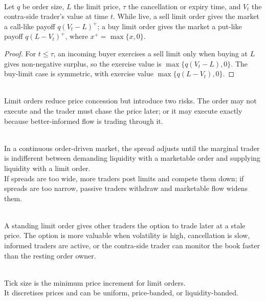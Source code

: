 \documentclass[a4paper,oneside,openany]{book}
\begin{document}
\begin{proposition} \\
Let $q$ be order size, $L$ the limit price, $\tau$ the cancellation or expiry time, and $V_t$ the contra-side trader's value at time $t$. While live, a sell limit order gives the market a call-like payoff $q(V_t-L)^+$; a buy limit order gives the market a put-like payoff $q(L-V_t)^+$, where $x^+=\max\{x,0\}$.
\begin{proof}
For $t\leq\tau$, an incoming buyer exercises a sell limit only when buying at $L$ gives non-negative surplus, so the exercise value is $\max\{q(V_t-L),0\}$. The buy-limit case is symmetric, with exercise value $\max\{q(L-V_t),0\}$.
\end{proof}
\end{proposition}

\begin{caveat} \\
Limit orders reduce price concession but introduce two risks. The order may not execute and the trader must chase the price later; or it may execute exactly because better-informed flow is trading through it.
\end{caveat}

\begin{principle} \\
In a continuous order-driven market, the spread adjusts until the marginal trader is indifferent between demanding liquidity with a marketable order and supplying liquidity with a limit order.\\
If spreads are too wide, more traders post limits and compete them down; if spreads are too narrow, passive traders withdraw and marketable flow widens them.
\end{principle}

\begin{mechanism} \\
A standing limit order gives other traders the option to trade later at a stale price. The option is more valuable when volatility is high, cancellation is slow, informed traders are active, or the contra-side trader can monitor the book faster than the resting order owner.
\end{mechanism}

\begin{definition} \\
Tick size is the minimum price increment for limit orders.\\
It discretises prices and can be uniform, price-banded, or liquidity-banded.
\end{definition}
\end{document}

